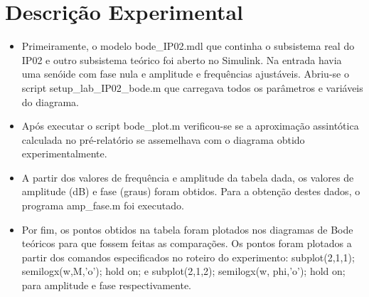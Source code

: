 \documentclass[journal]{IEEEtran}
\begin{document}
\section{Descrição Experimental}
\begin{itemize}
 \item Primeiramente, o modelo bode\_IP02.mdl que continha o 
subsistema real do IP02  e outro subsistema teórico foi aberto no 
Simulink. Na entrada havia uma senóide  com fase nula e amplitude e 
frequências ajustáveis. Abriu-se o script setup\_lab\_IP02\_bode.m 
que carregava todos os parâmetros e variáveis do diagrama.

\item Após executar o script bode\_plot.m verificou-se se a 
aproximação assintótica calculada no pré-relatório se assemelhava com 
o diagrama obtido experimentalmente.

\item A partir dos valores de frequência e amplitude da tabela dada, 
os valores de amplitude (dB) e fase (graus) foram obtidos. Para a 
obtenção destes dados, o programa amp\_fase.m foi executado.

\item Por fim, os pontos obtidos na tabela foram plotados nos 
diagramas de Bode teóricos para que fossem feitas as comparações. Os 
pontos foram plotados a partir dos comandos especificados no roteiro 
do experimento: subplot(2,1,1); semilogx(w,M,’o’); hold on; e 
subplot(2,1,2); semilogx(w, phi,’o’); hold on; para amplitude e fase 
respectivamente.
\end{itemize}

\end{document}
